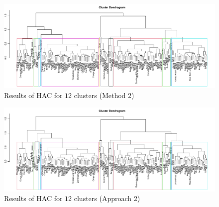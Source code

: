 \documentclass[a4paper,12pt]{article}
\numberwithin{equation}{section}
\begin{document}
\begin{figure}
\includegraphics[width=\textwidth]{plots/14days/dendrogram_alt}
\caption{Results of HAC for $12$ clusters (Method 2)}\label{fig:dend_alt}
\end{figure}


\begin{figure}
\includegraphics[width=\textwidth]{plots/14days/dendrogram_alt}
\caption{Results of HAC for $12$ clusters (Approach 2)}\label{fig:dend_alt}
\end{figure}
\end{document}

